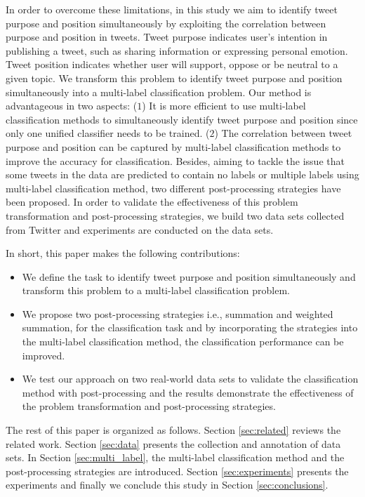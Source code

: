 \documentclass[letterpaper]{article}
\begin{document}
In order to overcome these limitations, in this study we aim to identify tweet purpose and position simultaneously by exploiting the correlation between purpose and position in tweets. Tweet purpose indicates user’s intention in publishing a tweet, such as sharing information or expressing personal emotion. Tweet position indicates whether user will support, oppose or be neutral to a given topic. We transform this problem to identify tweet purpose and position simultaneously into a multi-label classification problem. Our method is advantageous in two aspects: ($1$) It is more efficient to use multi-label classification methods to simultaneously identify tweet purpose and position since only one unified classifier needs to be trained. ($2$) The correlation between tweet purpose and position can be captured by multi-label classification methods to improve the accuracy for classification. Besides, aiming to tackle the issue that some tweets in the data are predicted to contain no labels or multiple labels using multi-label classification method, two different post-processing strategies have been proposed. In order to validate the effectiveness of this problem transformation and post-processing strategies, we build two data sets collected from Twitter and experiments are conducted on the data sets.

In short, this paper makes the following contributions:
\begin{itemize}
    \item We define the task to identify tweet purpose and position simultaneously and transform this problem to a multi-label classification problem.
    \item We propose two post-processing strategies i.e., summation and weighted summation, for the classification task and by incorporating the strategies into the multi-label classification method, the classification performance can be improved.
    \item We test our approach on two real-world data sets to validate the classification method with post-processing and the results demonstrate the effectiveness of the problem transformation and post-processing strategies.
\end{itemize}

The rest of this paper is organized as follows. Section \ref{sec:related} reviews the related work. Section \ref{sec:data} presents the collection and annotation of data sets. In Section \ref{sec:multi_label}, the multi-label classification method and the post-processing strategies are introduced. Section \ref{sec:experiments} presents the experiments and finally we conclude this study in Section \ref{sec:conclusions}.
\end{document}
